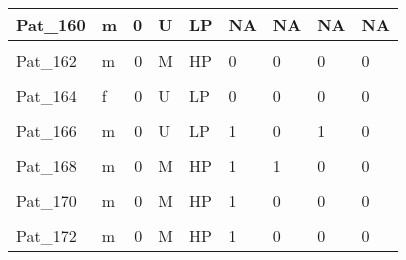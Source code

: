 \documentclass[11pt, a4paper, twosided]{book}
\begin{document}
\begin{longtable}[t]{l|l|r|l|l|l|l|l|l}
\hline
Pat\_160 & m & 0 & U & LP & NA & NA & NA & NA\\
\hline
\cellcolor[HTML]{E2E868}{Pat\_161} & \cellcolor[HTML]{E2E868}{m} & \cellcolor[HTML]{E2E868}{1} & \cellcolor[HTML]{E2E868}{U} & \cellcolor[HTML]{E2E868}{LP} & \cellcolor[HTML]{E2E868}{0} & \cellcolor[HTML]{E2E868}{0} & \cellcolor[HTML]{E2E868}{0} & \cellcolor[HTML]{E2E868}{0}\\
\hline
Pat\_162 & m & 0 & M & HP & 0 & 0 & 0 & 0\\
\hline
\cellcolor[HTML]{E2E868}{Pat\_163} & \cellcolor[HTML]{E2E868}{m} & \cellcolor[HTML]{E2E868}{0} & \cellcolor[HTML]{E2E868}{M} & \cellcolor[HTML]{E2E868}{HP} & \cellcolor[HTML]{E2E868}{0} & \cellcolor[HTML]{E2E868}{0} & \cellcolor[HTML]{E2E868}{0} & \cellcolor[HTML]{E2E868}{0}\\
\hline
Pat\_164 & f & 0 & U & LP & 0 & 0 & 0 & 0\\
\hline
\cellcolor[HTML]{E2E868}{Pat\_165} & \cellcolor[HTML]{E2E868}{m} & \cellcolor[HTML]{E2E868}{1} & \cellcolor[HTML]{E2E868}{U} & \cellcolor[HTML]{E2E868}{LP} & \cellcolor[HTML]{E2E868}{0} & \cellcolor[HTML]{E2E868}{1} & \cellcolor[HTML]{E2E868}{1} & \cellcolor[HTML]{E2E868}{0}\\
\hline
Pat\_166 & m & 0 & U & LP & 1 & 0 & 1 & 0\\
\hline
\cellcolor[HTML]{E2E868}{Pat\_167} & \cellcolor[HTML]{E2E868}{m} & \cellcolor[HTML]{E2E868}{0} & \cellcolor[HTML]{E2E868}{NA} & \cellcolor[HTML]{E2E868}{IP} & \cellcolor[HTML]{E2E868}{NA} & \cellcolor[HTML]{E2E868}{NA} & \cellcolor[HTML]{E2E868}{NA} & \cellcolor[HTML]{E2E868}{NA}\\
\hline
Pat\_168 & m & 0 & M & HP & 1 & 1 & 0 & 0\\
\hline
\cellcolor[HTML]{E2E868}{Pat\_169} & \cellcolor[HTML]{E2E868}{m} & \cellcolor[HTML]{E2E868}{0} & \cellcolor[HTML]{E2E868}{M} & \cellcolor[HTML]{E2E868}{HP} & \cellcolor[HTML]{E2E868}{0} & \cellcolor[HTML]{E2E868}{0} & \cellcolor[HTML]{E2E868}{1} & \cellcolor[HTML]{E2E868}{0}\\
\hline
Pat\_170 & m & 0 & M & HP & 1 & 0 & 0 & 0\\
\hline
\cellcolor[HTML]{E2E868}{Pat\_171} & \cellcolor[HTML]{E2E868}{m} & \cellcolor[HTML]{E2E868}{0} & \cellcolor[HTML]{E2E868}{M} & \cellcolor[HTML]{E2E868}{HP} & \cellcolor[HTML]{E2E868}{1} & \cellcolor[HTML]{E2E868}{0} & \cellcolor[HTML]{E2E868}{0} & \cellcolor[HTML]{E2E868}{0}\\
\hline
Pat\_172 & m & 0 & M & HP & 1 & 0 & 0 & 0\\
\hline

\end{longtable}
\end{document}
